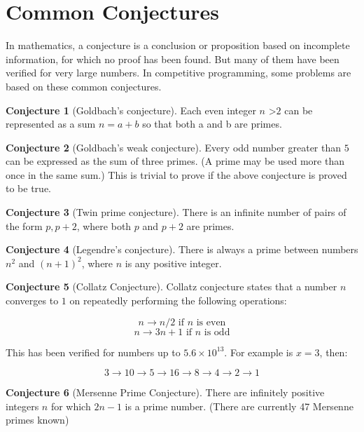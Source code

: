 \documentclass[twoside,12pt,a4paper,english]{book}
\theoremstyle{definition}
\theoremstyle{problemstyle}
\newtheorem{conjecture}{Conjecture}
\begin{document}
\section{Common Conjectures}
In mathematics, a conjecture is a conclusion or proposition based on incomplete information, for which no proof has been found. But many of them have been verified for very large numbers. In competitive programming, some problems are based on these common conjectures.

\begin{conjecture}[Goldbach’s conjecture]
Each even integer $n$ \textgreater $2$ can be represented as a sum $n = a+ b$ so that both a and b are primes.
\end{conjecture}
\begin{conjecture}[Goldbach's weak conjecture]
Every odd number greater than $5$ can be expressed as the sum of three primes. (A prime may be used more than once in the same sum.) This is trivial to prove if the above conjecture is proved to be true.
\end{conjecture}
\begin{conjecture}[Twin prime conjecture]
There is an infinite number of pairs of the form ${p, p +2}$, where both $p$ and $p+2$ are primes.
\end{conjecture}
\begin{conjecture}[Legendre’s conjecture]
 There is always a prime between numbers $n^2$ and $(n+1)^2$, where $n$ is any positive integer.
\end{conjecture}
\begin{conjecture}[Collatz Conjecture]
Collatz conjecture states that a number $n$ converges to $1$ on repeatedly performing the following operations:

$$n \rightarrow n/2 \text{ if }n \text{ is even}$$
$$n \rightarrow 3n+1 \text{ if }n \text{ is odd}$$

This has been verified for numbers up to $5.6 \times 10^{13}$. For example is $x = 3$, then:

$$3 \rightarrow 10 \rightarrow 5 \rightarrow 16 \rightarrow 8 \rightarrow 4 \rightarrow 2 \rightarrow 1$$
\end{conjecture}

\begin{conjecture}[Mersenne Prime Conjecture]
There are infinitely positive integers $n$ for which $2n - 1$ is a prime number. (There are currently 47 Mersenne primes known)
\end{conjecture}
\newpage
\end{document}
